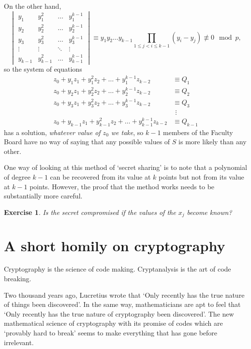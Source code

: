 \documentclass[12pt,a4paper]{article}
\theoremstyle{plain}
\newtheorem{exercise}[theorem]{Exercise}
\theoremstyle{definition}
\begin{document}
    On the other hand,
    \[
        \begin{vmatrix}
            y_{1}&y_{1}^{2}&\hdots&y_{1}^{k-1}\\
            y_{2}&y_{2}^{2}&\hdots&y_{2}^{k-1}\\
            y_{3}&y_{3}^{2}&\hdots&y_{3}^{k-1}\\
            \vdots&\vdots&\ddots&\vdots\\
            y_{k-1}&y_{k-1}^{2}&\hdots&y_{k-1}^{k-1}
        \end{vmatrix}
        \equiv y_{1}y_{2}\ldots y_{k-1}
        \prod_{1\leq j<i\leq k-1}(y_{i}-y_{j})\not\equiv 0\mod{p},\]
    so the system of equations
    \begin{align*}
        z_{0}+y_{1}z_{1}+y_{1}^{2}z_{2}+\hdots+y_{1}^{k-1}z_{k-2}
        &\equiv Q_{1}\\
        z_{0}+y_{2}z_{1}+y_{2}^{2}z_{2}+\hdots+y_{2}^{k-1}z_{k-2}
        &\equiv Q_{2}\\
        z_{0}+y_{3}z_{1}+y_{3}^{2}z_{2}+\hdots+y_{3}^{k-1}z_{k-2}
        &\equiv Q_{3}\\
        &\ \,\vdots\\
        z_{0}+y_{k-1}z_{1}+y_{k-1}^{2}z_{2}+
        \hdots+y_{k-1}^{k-1}z_{k-2}&\equiv Q_{k-1}
    \end{align*}
    has a solution, \emph{whatever value of $z_{0}$ we take},
    so $k-1$ members of the Faculty Board have no
    way of saying that any possible values of $S$ is
    more likely than any other.

    One way of looking at this method of `secret sharing'
    is to note that a polynomial
    of degree $k-1$ can be recovered from its value at $k$ points
    but not from its value at $k-1$ points. However, the proof
    that the method works needs to be substantially more careful.
    \begin{exercise}
        Is the secret compromised if the
        values of the $x_{j}$ become known?
    \end{exercise}
    \section{A short homily on cryptography}
    Cryptography is the science of
    code making. Cryptanalysis is the
    art of
    code breaking.

    Two thousand years ago, Lucretius wrote that
    `Only recently has the true nature of things
    been discovered'. In the same way, mathematicians
    are apt to feel that `Only recently has
    the true nature of cryptography been
    discovered'. The new mathematical science
    of cryptography with its promise of codes
    which are `provably hard to break' seems
    to make everything that has gone before
    irrelevant.
\end{document}
